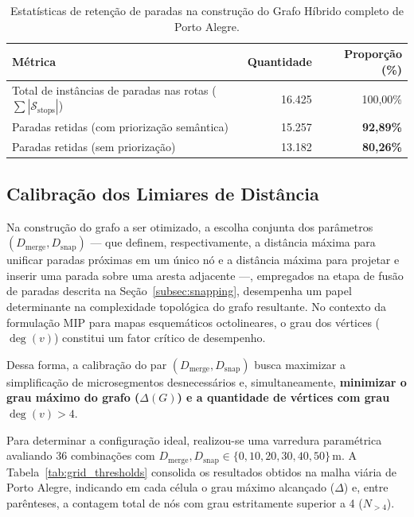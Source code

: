 \documentclass[cic,tc]{infufrgs}
\begin{document}
\begin{table}[H]
    \centering
    \caption{Estatísticas de retenção de paradas na construção do Grafo Híbrido completo de Porto Alegre.}
    \label{tab:estatisticas_grafo_hibrido}
    \begin{tabular}{lrr}
        \toprule
        \textbf{Métrica} & \textbf{Quantidade} & \textbf{Proporção (\%)} \\
        \midrule
        Total de instâncias de paradas nas rotas ($\sum |\mathcal{S}_{\text{stops}}|$) & 16.425 & 100,00\% \\
        Paradas retidas (com priorização semântica) & 15.257 & \textbf{92,89\%} \\
        Paradas retidas (sem priorização) & 13.182 & \textbf{80,26\%} \\
        \bottomrule
    \end{tabular}
\end{table}

\subsection{Calibração dos Limiares de Distância}
\label{subsec:thresholds_distancias}

Na construção do grafo a ser otimizado, a escolha conjunta dos parâmetros $(D_{\text{merge}}, D_{\text{snap}})$ — que definem, respectivamente, a distância máxima para unificar paradas próximas em um único nó e a distância máxima para projetar e inserir uma parada sobre uma aresta adjacente —, empregados na etapa de fusão de paradas descrita na Seção~\ref{subsec:snapping}, desempenha um papel determinante na complexidade topológica do grafo resultante. No contexto da formulação MIP para mapas esquemáticos octolineares, o grau dos vértices ($\deg(v)$) constitui um fator crítico de desempenho.

Dessa forma, a calibração do par $(D_{\text{merge}}, D_{\text{snap}})$ busca maximizar a simplificação de microsegmentos desnecessários e, simultaneamente, \textbf{minimizar o grau máximo do grafo ($\Delta(G)$) e a quantidade de vértices com grau $\deg(v) > 4$}.

Para determinar a configuração ideal, realizou-se uma varredura paramétrica avaliando 36 combinações com $D_{\text{merge}}, D_{\text{snap}} \in \{0, 10, 20, 30, 40, 50\}\,\text{m}$. A Tabela~\ref{tab:grid_thresholds} consolida os resultados obtidos na malha viária de Porto Alegre, indicando em cada célula o grau máximo alcançado ($\Delta$) e, entre parênteses, a contagem total de nós com grau estritamente superior a 4 ($N_{>4}$).
\end{document}
